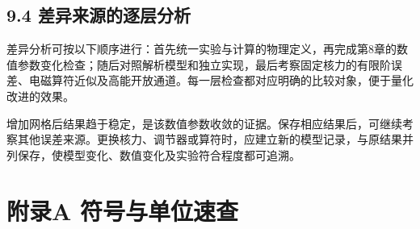 \documentclass[UTF8,a4paper,zihao=5,fontset=fandol]{ctexart}
\begin{document}
\clearpage
{}\subsection*{9.4 差异来源的逐层分析}
差异分析可按以下顺序进行：首先统一实验与计算的物理定义，再完成第8章的数值参数变化检查；随后对照解析模型和独立实现，最后考察固定核力的有限阶误差、电磁算符近似及高能开放通道。每一层检查都对应明确的比较对象，便于量化改进的效果。

增加网格后结果趋于稳定，是该数值参数收敛的证据。保存相应结果后，可继续考察其他误差来源。更换核力、调节器或算符时，应建立新的模型记录，与原结果并列保存，使模型变化、数值变化及实验符合程度都可追溯。

\clearpage\section*{附录A 符号与单位速查}
\end{document}
